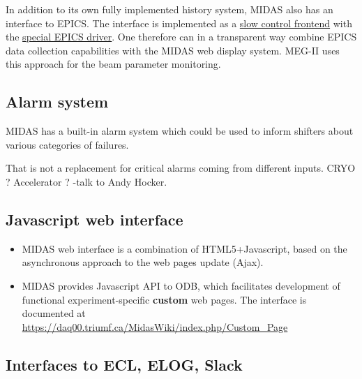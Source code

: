In addition to its own fully implemented history system, MIDAS also has an interface to EPICS.
The interface is implemented as a 
\href{https://bitbucket.org/tmidas/midas/src/develop/examples/epics/}
         {\blue slow control frontend} with the 
\href{https://bitbucket.org/tmidas/midas/src/develop/drivers/device/epics_ca.cxx}
{\blue special EPICS driver}.
%
One therefore can in a transparent way combine EPICS data collection capabilities 
with the MIDAS web display system. MEG-II uses this approach for the beam parameter monitoring.



\subsection{Alarm system}

MIDAS has a built-in alarm system which could be used to inform shifters
about various categories of failures.

That is not a replacement for critical alarms coming from different inputs.
CRYO ? Accelerator ? -{\red talk to Andy Hocker.}


\subsection{Javascript web interface}

\begin{itemize}
\item 
  MIDAS web interface is a combination of HTML5+Javascript, based on the
  asynchronous approach to the web pages update (Ajax).
\item 
  MIDAS provides Javascript API to ODB, which facilitates development of
  functional experiment-specific {\bf custom} web pages.
  The interface is documented at \\
  \href{https://daq00.triumf.ca/MidasWiki/index.php/Custom\_Page}
  {\blue https://daq00.triumf.ca/MidasWiki/index.php/Custom\_Page}
\end{itemize}


\subsection{Interfaces to ECL, ELOG, Slack}

